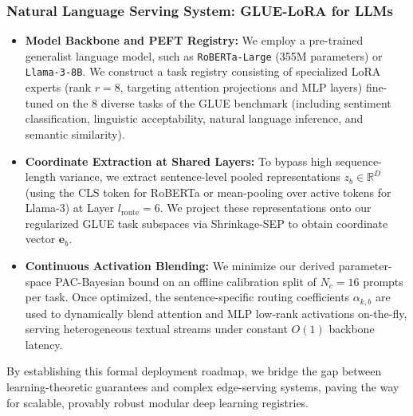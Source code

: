 \subsubsection{Natural Language Serving System: GLUE-LoRA for LLMs}
\begin{itemize}
    \item \textbf{Model Backbone and PEFT Registry:} We employ a pre-trained generalist language model, such as \texttt{RoBERTa-Large} (355M parameters) or \texttt{Llama-3-8B}. We construct a task registry consisting of specialized LoRA experts (rank $r=8$, targeting attention projections and MLP layers) fine-tuned on the 8 diverse tasks of the GLUE benchmark \cite{wang2018glue} (including sentiment classification, linguistic acceptability, natural language inference, and semantic similarity).
    \item \textbf{Coordinate Extraction at Shared Layers:} To bypass high sequence-length variance, we extract sentence-level pooled representations $z_b \in \mathbb{R}^D$ (using the CLS token for RoBERTa or mean-pooling over active tokens for Llama-3) at Layer $l_{\text{route}} = 6$. We project these representations onto our regularized GLUE task subspaces via Shrinkage-SEP to obtain coordinate vector $\mathbf{e}_b$.
    \item \textbf{Continuous Activation Blending:} We minimize our derived parameter-space PAC-Bayesian bound on an offline calibration split of $N_c = 16$ prompts per task. Once optimized, the sentence-specific routing coefficients $\alpha_{k, b}$ are used to dynamically blend attention and MLP low-rank activations on-the-fly, serving heterogeneous textual streams under constant $O(1)$ backbone latency.
\end{itemize}
By establishing this formal deployment roadmap, we bridge the gap between learning-theoretic guarantees and complex edge-serving systems, paving the way for scalable, provably robust modular deep learning registries.
